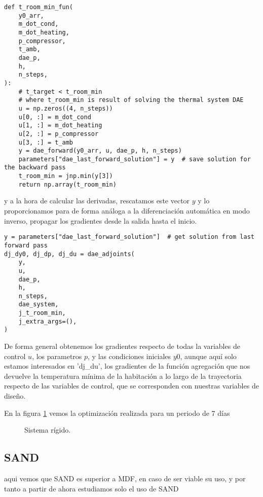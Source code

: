 \begin{verbatim}
def t_room_min_fun(
    y0_arr,
    m_dot_cond,
    m_dot_heating,
    p_compressor,
    t_amb,
    dae_p,
    h,
    n_steps,
):
    # t_target < t_room_min
    # where t_room_min is result of solving the thermal system DAE
    u = np.zeros((4, n_steps))
    u[0, :] = m_dot_cond
    u[1, :] = m_dot_heating
    u[2, :] = p_compressor
    u[3, :] = t_amb
    y = dae_forward(y0_arr, u, dae_p, h, n_steps)
    parameters["dae_last_forward_solution"] = y  # save solution for the backward pass
    t_room_min = jnp.min(y[3])
    return np.array(t_room_min)
\end{verbatim}

y a la hora de calcular las derivadas, rescatamos este vector $y$ y lo
proporcionamos para de forma análoga a la diferenciación automática en modo
inverso, propagar los gradientes desde la salida hasta el inicio.

\begin{verbatim}
y = parameters["dae_last_forward_solution"]  # get solution from last forward pass
dj_dy0, dj_dp, dj_du = dae_adjoints(
    y,
    u,
    dae_p,
    h,
    n_steps,
    dae_system,
    j_t_room_min,
    j_extra_args=(),
)
\end{verbatim}

De forma general obtenemos los gradientes respecto de todas la variables de
control $u$, los parametros $p$, y las condiciones iniciales $y0$, aunque aquí
solo estamos interesados en 'dj\_du', los gradientes de la función agregación
que nos devuelve la temperatura mínima de la habitación a lo largo de la
trayectoria respecto de las variables de control, que se corresponden con
nuestras variables de diseño.


En la figura \ref{fig:control_adjoints_7_days} vemos la optimización realizada
para un periodo de 7 días

\begin{figure}[h] \centering
	\centering
	
	\caption{Sistema rígido.}
	\label{fig:control_adjoints_7_days}
\end{figure}



\clearpage
\subsection{SAND}

aqui vemos que SAND es superior a MDF, en caso de ser viable su uso,
y por tanto a partir de ahora estudiamos solo el uso de SAND
